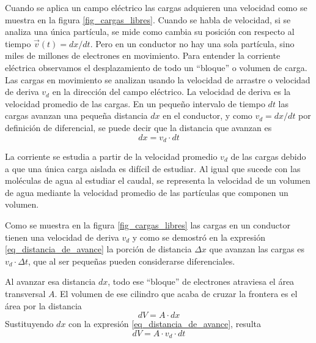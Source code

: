 \begin{marginfigure}[-1cm]
  \centering
  
  \caption{Cargas en movimiento a través de un área \(A\).}
  \label{fig:current}
\end{marginfigure}
Cuando se aplica un campo eléctrico las cargas adquieren una velocidad como se muestra en la figura \ref{fig_cargas_libres}. Cuando se habla de velocidad, si se analiza una única partícula, se mide como cambia su posición con respecto al tiempo \(\vec{v}(t)=dx/dt\). Pero en un conductor no hay una sola partícula, sino miles de millones de electrones en movimiento. Para entender la corriente eléctrica observamos el desplazamiento de todo un ``bloque'' o volumen de carga. Las cargas en movimiento se analizan usando la velocidad de arrastre o velocidad de deriva \(v_d\) en la dirección del campo eléctrico. La velocidad de deriva es la velocidad promedio de las cargas. En un pequeño intervalo de tiempo \(dt\) las cargas avanzan una pequeña distancia \(dx\) en el conductor, y como \(v_d=dx/dt\) por definición de diferencial, se puede decir que la distancia que avanzan es 
\begin{equation}\label{eq_distancia_de_avance}
  dx=v_d\cdot dt
\end{equation}

\begin{tcolorbox}[myconclusion]
  La corriente se estudia a partir de la velocidad promedio \(v_d\) de las cargas debido a que una única carga aislada es difícil de estudiar. Al igual que sucede con las moléculas de agua al estudiar el caudal, se representa la velocidad de un volumen de agua mediante la velocidad promedio de las partículas que componen un volumen.
\end{tcolorbox}

Como se muestra en la figura \ref{fig_cargas_libres} las cargas en un conductor tienen una velocidad de deriva \(v_d\) y como se demostró en la expresión \eqref{eq_distancia_de_avance} la porción de distancia \(\Delta x\) que avanzan las cargas es \(v_d \cdot \Delta t\), que al ser pequeñas pueden considerarse diferenciales.

Al avanzar esa distancia \(dx\), todo ese ``bloque'' de electrones atraviesa el área transversal \(A\). El volumen de ese cilindro que acaba de cruzar la frontera es el área por la distancia 
\[
  dV=A \cdot dx
\]
Sustituyendo \(dx\) con la expresión \eqref{eq_distancia_de_avance}, resulta
\begin{equation}\label{eq_volumen_de_cargas}
  dV=A\cdot v_d \cdot dt
\end{equation}

